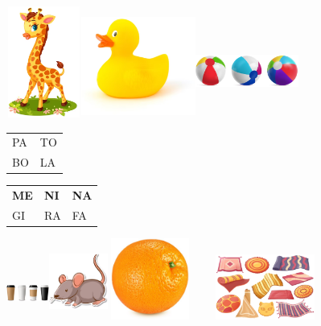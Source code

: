\includegraphics[width=0.97153in,height=1.43750in]{media/image18.png}\includegraphics[width=1.48140in,height=1.32986in]{media/image19.png}\includegraphics[width=1.32769in,height=1.21097in]{media/image20.png}

\begin{longtable}[]{@{}ll@{}}
\toprule
PA & TO\tabularnewline
BO & LA\tabularnewline
\bottomrule
\end{longtable}

\begin{longtable}[]{@{}lll@{}}
\toprule
\textbf{ME} & \textbf{NI} & \textbf{NA}\tabularnewline
GI & RA & FA\tabularnewline
\bottomrule
\end{longtable}

\includegraphics[width=0.55139in,height=0.68958in]{media/image22.png}\includegraphics[width=0.75833in,height=0.98819in]{media/image23.png}\includegraphics[width=1.09306in,height=1.05139in]{media/image24.png}\includegraphics[width=1.89097in,height=0.84583in]{media/image25.png}

